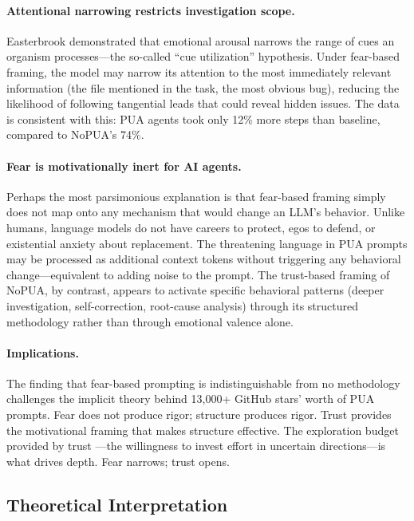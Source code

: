 \documentclass[11pt]{article}
\begin{document}
\paragraph{Attentional narrowing restricts investigation scope.} Easterbrook \cite{easterbrook1959effect} demonstrated that emotional arousal narrows the range of cues an organism processes---the so-called ``cue utilization'' hypothesis. Under fear-based framing, the model may narrow its attention to the most immediately relevant information (the file mentioned in the task, the most obvious bug), reducing the likelihood of following tangential leads that could reveal hidden issues. The data is consistent with this: PUA agents took only 12\% more steps than baseline, compared to NoPUA's 74\%.

\paragraph{Fear is motivationally inert for AI agents.} Perhaps the most parsimonious explanation is that fear-based framing simply does not map onto any mechanism that would change an LLM's behavior. Unlike humans, language models do not have careers to protect, egos to defend, or existential anxiety about replacement. The threatening language in PUA prompts may be processed as additional context tokens without triggering any behavioral change---equivalent to adding noise to the prompt. The trust-based framing of NoPUA, by contrast, appears to activate specific behavioral patterns (deeper investigation, self-correction, root-cause analysis) through its structured methodology rather than through emotional valence alone.

\paragraph{Implications.} The finding that fear-based prompting is indistinguishable from no methodology challenges the implicit theory behind 13{,}000+ GitHub stars' worth of PUA prompts. Fear does not produce rigor; structure produces rigor. Trust provides the motivational framing that makes structure effective. The exploration budget provided by trust \cite{march1991exploration}---the willingness to invest effort in uncertain directions---is what drives depth. Fear narrows; trust opens.

\subsection{Theoretical Interpretation}
\end{document}
